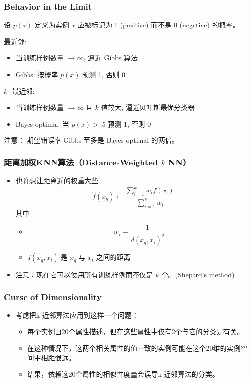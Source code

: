\documentclass{beamer}
\begin{document}
\begin{frame}
\frametitle{Behavior in the Limit}
\label{sec-2-4}


设 $p(x)$ 定义为实例 $x$ 应被标记为 1 (positive) 而不是  0 (negative) 的概率。

最近邻: 
\begin{itemize}
\item 当训练样例数量 $\rightarrow \infty$, 逼近 Gibbs 算法
\item Gibbs: 按概率 $p(x)$ 预测  1, 否则 0
\end{itemize}

$k$ -最近邻: 
\begin{itemize}
\item 当训练样例数量 $\rightarrow \infty$ 且 $k$ 值较大, 逼近贝叶斯最优分类器
\item Bayes optimal: 当 $p(x)>.5$ 预测 1, 否则 0
\end{itemize}


注意： 期望错误率 Gibbs 至多是 Bayes optimal 的两倍。
\end{frame}
\begin{frame}
\frametitle{距离加权KNN算法（Distance-Weighted $k$ NN）}
\label{sec-2-5}


\begin{itemize}
\item 也许想让距离近的权重大些
  $$\hat{f}(x_{q}) \leftarrow  \frac{\sum_{i=1}^{k} w_{i} f(x_{i})}{\sum_{i=1}^{k} w_{i}}$$
  其中
\begin{itemize}
\item $$w_{i} \equiv \frac{1}{d(x_{q}, x_{i})^{2}}$$
\item $d(x_{q}, x_{i})$ 是 $x_{q}$ 与 $x_{i}$ 之间的距离
\end{itemize}
\item 注意：现在它可以使用所有训练样例而不仅是 $k$ 个。(Shepard's method)
\end{itemize}
\end{frame}
\begin{frame}
\frametitle{Curse of Dimensionality}
\label{sec-2-6}

\begin{itemize}
\item 考虑把k-近邻算法应用到这样一个问题：
\begin{itemize}
\item 每个实例由20个属性描述，但在这些属性中仅有2个与它的分类是有关。
\item 在这种情况下，这两个相关属性的值一致的实例可能在这个20维的实例空间中相距很远。
\item 结果，依赖这20个属性的相似性度量会误导k-近邻算法的分类。
\end{itemize}
\end{itemize}
\end{frame}
\end{document}
